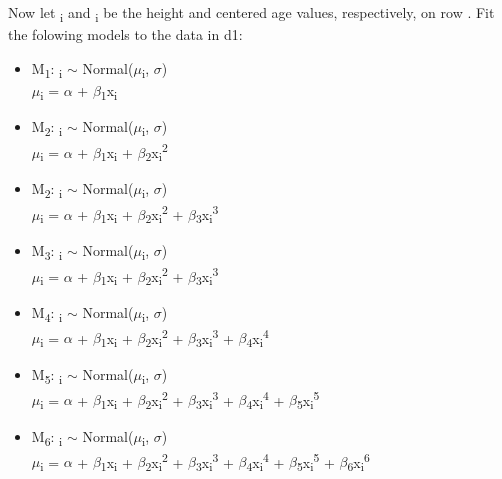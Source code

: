 \documentclass[12pt]{article}\usepackage[]{graphicx}\usepackage[]{color}
\begin{document}
Now let \textsubscript{i} and \textsubscript{i} be the height and centered age values, respectively, on row . Fit the folowing models to the data in d1:
\begin{itemize}
\item M\textsubscript{1}: \textsubscript{i} $\sim$ Normal($\mu$\textsubscript{i}, $\sigma$)\\
$\mu$\textsubscript{i} = $\alpha$ + $\beta$\textsubscript{1}x\textsubscript{i}
\item M\textsubscript{2}: \textsubscript{i} $\sim$ Normal($\mu$\textsubscript{i}, $\sigma$)\\
$\mu$\textsubscript{i} = $\alpha$ + $\beta$\textsubscript{1}x\textsubscript{i} + $\beta$\textsubscript{2}x\textsubscript{i}\textsuperscript{2}
\item M\textsubscript{2}: \textsubscript{i} $\sim$ Normal($\mu$\textsubscript{i}, $\sigma$)\\
$\mu$\textsubscript{i} = $\alpha$ + $\beta$\textsubscript{1}x\textsubscript{i} + $\beta$\textsubscript{2}x\textsubscript{i}\textsuperscript{2} + $\beta$\textsubscript{3}x\textsubscript{i}\textsuperscript{3}
\item M\textsubscript{3}: \textsubscript{i} $\sim$ Normal($\mu$\textsubscript{i}, $\sigma$)\\
$\mu$\textsubscript{i} = $\alpha$ + $\beta$\textsubscript{1}x\textsubscript{i} + $\beta$\textsubscript{2}x\textsubscript{i}\textsuperscript{2} + $\beta$\textsubscript{3}x\textsubscript{i}\textsuperscript{3}
\item M\textsubscript{4}: \textsubscript{i} $\sim$ Normal($\mu$\textsubscript{i}, $\sigma$)\\
$\mu$\textsubscript{i} = $\alpha$ + $\beta$\textsubscript{1}x\textsubscript{i} + $\beta$\textsubscript{2}x\textsubscript{i}\textsuperscript{2} + $\beta$\textsubscript{3}x\textsubscript{i}\textsuperscript{3} + $\beta$\textsubscript{4}x\textsubscript{i}\textsuperscript{4}
\item M\textsubscript{5}: \textsubscript{i} $\sim$ Normal($\mu$\textsubscript{i}, $\sigma$)\\
$\mu$\textsubscript{i} = $\alpha$ + $\beta$\textsubscript{1}x\textsubscript{i} + $\beta$\textsubscript{2}x\textsubscript{i}\textsuperscript{2} + $\beta$\textsubscript{3}x\textsubscript{i}\textsuperscript{3} + $\beta$\textsubscript{4}x\textsubscript{i}\textsuperscript{4} + $\beta$\textsubscript{5}x\textsubscript{i}\textsuperscript{5}
\item M\textsubscript{6}: \textsubscript{i} $\sim$ Normal($\mu$\textsubscript{i}, $\sigma$)\\
$\mu$\textsubscript{i} = $\alpha$ + $\beta$\textsubscript{1}x\textsubscript{i} + $\beta$\textsubscript{2}x\textsubscript{i}\textsuperscript{2} + $\beta$\textsubscript{3}x\textsubscript{i}\textsuperscript{3} + $\beta$\textsubscript{4}x\textsubscript{i}\textsuperscript{4} + $\beta$\textsubscript{5}x\textsubscript{i}\textsuperscript{5} + $\beta$\textsubscript{6}x\textsubscript{i}\textsuperscript{6}
\end{itemize}
\end{document}

